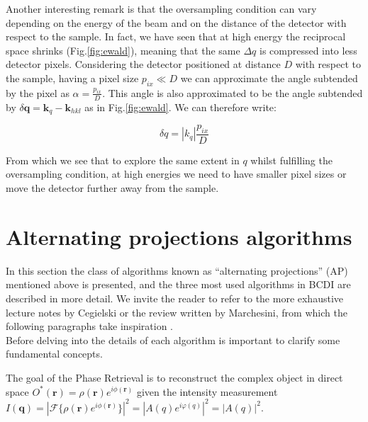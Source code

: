 Another interesting remark is that the oversampling condition can vary depending on the energy of the beam and on the 
distance of the detector with respect to the sample. 
In fact, we have seen that at high energy the reciprocal space shrinks (Fig.\ref{fig:ewald}), meaning that the same $\Delta q$ is compressed 
into less detector pixels. Considering the detector positioned at distance $D$ with respect to the sample, having a pixel 
size $p_{ix} \ll D$ we can approximate the angle subtended by the pixel as $\alpha = \frac{p_{ix}}{D}$. This angle 
is also approximated to be the angle subtended by $\delta \mathbf{q} = \mathbf{k}_{q} - \mathbf{k}_{hkl} $ as in Fig.\ref{fig:ewald}. 
We can therefore write: 

\begin{equation}
    \delta q = |k_{q}|\frac{p_{ix}}{D} 
\end{equation}

From which we see that to explore the same extent in $q$ whilst fulfilling the oversampling condition, at high energies 
we need to have smaller pixel sizes or move the detector further away from the sample. 

\section{Alternating projections algorithms}

In this section the class of algorithms known as ``alternating projections'' (AP) mentioned above is presented, and the three most 
used algorithms in BCDI are described in more detail. We invite the reader to refer to the more exhaustive lecture notes by 
Cegielski \cite{book_iterative2012} or the review written by Marchesini, from which the following paragraphs take 
inspiration \cite{marchesini_unified_2007} .\\

Before delving into the details of each algorithm is important to clarify some fundamental concepts.

The goal of the Phase Retrieval is to reconstruct the complex object in direct space $O^{\ast}(\mathbf{r}) = \rho(\mathbf{r})e^{i\phi(\mathbf{r})}$
given the intensity measurement $I(\mathbf{q}) = |\mathcal{F}\{\rho(\mathbf{r})e^{i\phi(\mathbf{r})}\}|^2 = |A(q)e^{i\varphi(q)}|^2 = |A(q)|^2 $. 

